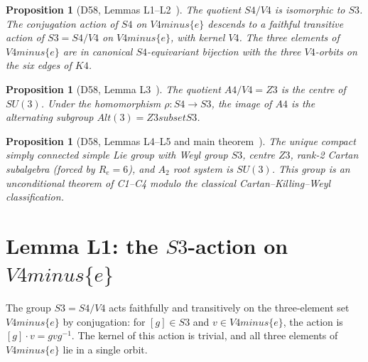\documentclass[11pt,a4paper]{article}
\def\Sfour{S4}%
\def\Vfour{V4}%
\def\Afour{A4}%
\def\Sthree{S3}%
\def\Zthree{Z3}%
\def\SUthree{SU(3)}%
\def\Kfour{K4}%
\def\Re{Re}%
\def\cong{=}%
\def\setminus{ minus }%
\def\subset{ subset }%
\def\mathbb#1{#1}%
\def\mathrm#1{#1}%
\newenvironment{lemmabox}[1][]{%
  \begin{tcolorbox}[lemmastyle,title={Lemma\ifx\relax#1\relax\else: #1\fi}]}{\end{tcolorbox}}
\theoremstyle{plain}
\newtheorem{proposition}[theorem]{Proposition}
\theoremstyle{definition}
\theoremstyle{remark}
\newcommand{\Kfour}{K_4}
\newcommand{\Sfour}{S_4}
\newcommand{\Afour}{A_4}
\newcommand{\Vfour}{V_4}
\newcommand{\Sthree}{S_3}
\newcommand{\Zthree}{\mathbb{Z}_3}
\newcommand{\SUthree}{\mathrm{SU}(3)}
\renewcommand{\Re}{R_e}
\begin{document}
\begin{proposition}[D58, Lemmas L1--L2~{\cite{PDL_D58}}]
\label{prop:D58_L1L2}
The quotient $\Sfour/\Vfour$ is isomorphic to $\Sthree$. The conjugation action of $\Sfour$ on $\Vfour \setminus \{e\}$ descends to a faithful transitive action of $\Sthree = \Sfour/\Vfour$ on $\Vfour \setminus \{e\}$, with kernel $\Vfour$. The three elements of $\Vfour \setminus \{e\}$ are in canonical $\Sfour$-equivariant bijection with the three $\Vfour$-orbits on the six edges of $\Kfour$.
\end{proposition}

\begin{proposition}[D58, Lemma L3~{\cite{PDL_D58}}]
\label{prop:D58_L3}
The quotient $\Afour/\Vfour \cong \Zthree$ is the centre of $\SUthree$. Under the homomorphism $\rho\colon \Sfour \to \Sthree$, the image of $\Afour$ is the alternating subgroup $\mathrm{Alt}(3) \cong \Zthree \subset \Sthree$.
\end{proposition}

\begin{proposition}[D58, Lemmas L4--L5 and main theorem~{\cite{PDL_D58}}]
\label{prop:D58_main}
The unique compact simply connected simple Lie group with Weyl group $\Sthree$, centre $\Zthree$, rank-2 Cartan subalgebra (forced by $\Re = 6$), and $A_2$ root system is $\SUthree$. This group is an unconditional theorem of C1--C4 modulo the classical Cartan--Killing--Weyl classification.
\end{proposition}

\section{Lemma L1: the \texorpdfstring{$\Sthree$}{S3}-action on \texorpdfstring{$\Vfour\setminus\{e\}$}{V4 minus e}}
\label{sec:L1}

\begin{lemmabox}[L1 --- Faithful transitive action (recalled from D58)]
\label{lem:L1}
The group $\Sthree = \Sfour/\Vfour$ acts faithfully and transitively on the three-element set $\Vfour \setminus \{e\}$ by conjugation: for $[g] \in \Sthree$ and $v \in \Vfour \setminus \{e\}$, the action is $[g] \cdot v = g v g^{-1}$. The kernel of this action is trivial, and all three elements of $\Vfour \setminus \{e\}$ lie in a single orbit.
\end{lemmabox}
\end{document}
